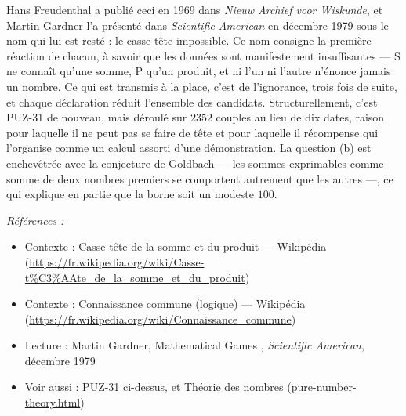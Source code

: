 \documentclass[11pt]{article}
\newenvironment{refs}{\par\small\noindent\emph{Références :}\begin{itemize}\setlength\itemsep{0pt}}{\end{itemize}\normalsize}
\begin{document}
\noindent Hans Freudenthal a publié ceci en 1969 dans \textit{Nieuw Archief voor
Wiskunde}, et Martin Gardner l'a présenté dans \textit{Scientific American} en décembre 1979
sous le nom qui lui est resté : le casse-tête impossible. Ce nom consigne la première
réaction de chacun, à savoir que les données sont manifestement insuffisantes --- S ne connaît
qu'une somme, P qu'un produit, et ni l'un ni l'autre n'énonce jamais un nombre. Ce qui est
transmis à la place, c'est de l'ignorance, trois fois de suite, et chaque déclaration réduit
l'ensemble des candidats. Structurellement, c'est PUZ-31 de nouveau, mais déroulé sur
$ 2352 $ couples au lieu de dix dates, raison pour laquelle il ne peut pas se faire de tête
et pour laquelle il récompense qui l'organise comme un calcul assorti d'une démonstration. La
question (b) est enchevêtrée avec la conjecture de Goldbach --- les sommes exprimables comme
somme de deux nombres premiers se comportent autrement que les autres ---, ce qui explique en
partie que la borne soit un modeste $ 100 $.

\begin{refs}
\item Contexte : Casse-tête de la somme et du produit --- Wikipédia (\url{https://fr.wikipedia.org/wiki/Casse-t%C3%AAte_de_la_somme_et_du_produit})
\item Contexte : Connaissance commune (logique) --- Wikipédia (\url{https://fr.wikipedia.org/wiki/Connaissance_commune})
\item Lecture : Martin Gardner, \og{} Mathematical Games \fg{}, \textit{Scientific American}, décembre 1979
\item Voir aussi : PUZ-31 ci-dessus, et Théorie des nombres (\url{pure-number-theory.html})
\end{refs}

\bigskip
\end{document}
